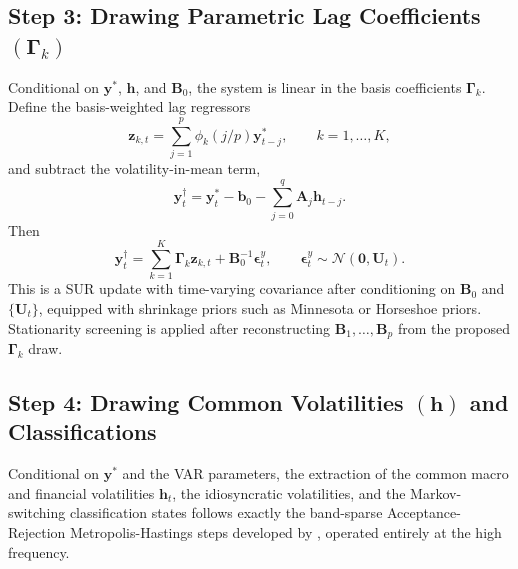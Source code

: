 \documentclass[12pt]{article}
\begin{document}
\subsection{Step 3: Drawing Parametric Lag Coefficients \texorpdfstring{$(\mathbf{\Gamma}_k)$}{(Gamma k)}}
Conditional on $\mathbf{y}^*$, $\mathbf{h}$, and $\mathbf{B}_0$, the system is linear in the basis coefficients $\mathbf{\Gamma}_k$. Define the basis-weighted lag regressors
\begin{equation}
    \mathbf{z}_{k,t}=\sum_{j=1}^p \phi_k(j/p)\mathbf{y}_{t-j}^*,
    \qquad k=1,\ldots,K,
\end{equation}
and subtract the volatility-in-mean term,
\begin{equation}
    \mathbf{y}_t^\dagger
    =
    \mathbf{y}_t^*-\mathbf{b}_0-\sum_{j=0}^q\mathbf{A}_j\mathbf{h}_{t-j}.
\end{equation}
Then
\begin{equation}
    \mathbf{y}_t^\dagger
    =
    \sum_{k=1}^K \mathbf{\Gamma}_k\mathbf{z}_{k,t}
    +
    \mathbf{B}_0^{-1}\bm{\epsilon}^y_t,
    \qquad \bm{\epsilon}^y_t\sim\mathcal{N}(\mathbf{0},\mathbf{U}_t).
\end{equation}
This is a SUR update with time-varying covariance after conditioning on $\mathbf{B}_0$ and $\{\mathbf{U}_t\}$, equipped with shrinkage priors such as Minnesota or Horseshoe priors. Stationarity screening is applied after reconstructing $\mathbf{B}_1,\ldots,\mathbf{B}_p$ from the proposed $\mathbf{\Gamma}_k$ draw.

\subsection{Step 4: Drawing Common Volatilities \texorpdfstring{$(\mathbf{h})$}{(h)} and Classifications}
Conditional on $\mathbf{y}^*$ and the VAR parameters, the extraction of the common macro and financial volatilities $\mathbf{h}_t$, the idiosyncratic volatilities, and the Markov-switching classification states follows exactly the band-sparse Acceptance-Rejection Metropolis-Hastings steps developed by \citet{davidson2025investigating}, operated entirely at the high frequency.
\end{document}
